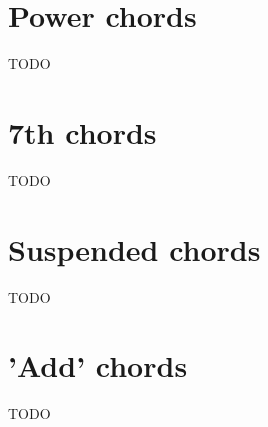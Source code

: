 \section{Power chords}
TODO

\section{7th chords}
TODO

\section{Suspended chords}
TODO

\section{'Add' chords}
TODO
